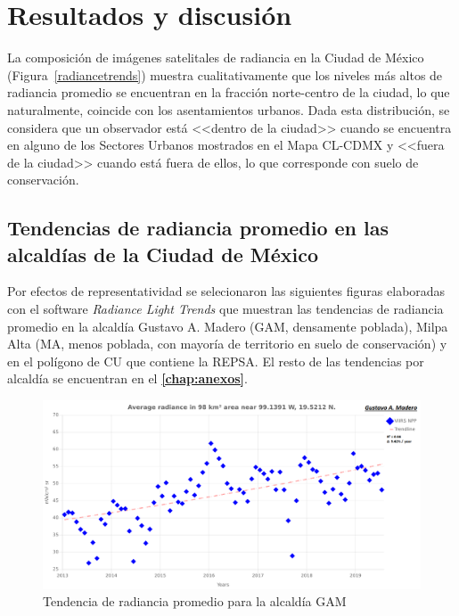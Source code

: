 \chapter{Resultados y discusión}

La composición de imágenes satelitales de radiancia en la Ciudad de México (Figura~\ref{radiancetrends}) muestra cualitativamente que los niveles más altos de radiancia promedio se encuentran en la fracción norte-centro de la ciudad, lo que naturalmente, coincide con los asentamientos urbanos. Dada esta distribución, se considera que un observador está <<dentro de la ciudad>> cuando se encuentra en alguno de los Sectores Urbanos mostrados en el Mapa CL-CDMX y <<fuera de la ciudad>> cuando está fuera de ellos, lo que corresponde con suelo de conservación. 

\section{Tendencias de radiancia promedio en las alcaldías de la Ciudad de México}
\label{subsec:tendenciasradiancia}

Por efectos de representatividad se selecionaron las siguientes figuras elaboradas con el software \textit{Radiance Light Trends} que muestran las tendencias de radiancia promedio en la alcaldía Gustavo A. Madero (GAM, densamente poblada), Milpa Alta (MA, menos poblada, con mayoría de territorio en suelo de conservación) y en el polígono de CU que contiene la REPSA. El resto de las tendencias por alcaldía se encuentran en el \textbf{\autoref{chap:anexos}}.

\begin{figure}[htb]
  \centering
    \includegraphics[width=1\textwidth]{GAM}
  \caption{Tendencia de radiancia promedio para la alcaldía GAM}
  \label{radiancetrendsgam}
\end{figure}

